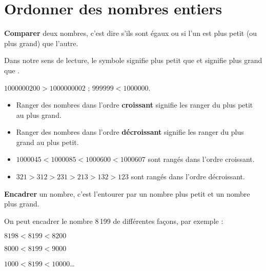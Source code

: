 \section{Ordonner des nombres entiers}

\begin{definition}
   {\bf Comparer} deux nombres, c'est dire s'ils sont égaux ou si l'un est plus petit (ou plus grand) que l'autre.
\end{definition}

\begin{notation}
   Dans notre sens de lecture, le symbole \fbox{<} signifie \og plus petit que \fg{} et \fbox{>} signifie \og plus grand que \fg.
\end{notation}

\begin{exemple*1}
   $\num{1000000200} > \num{1000000002}$ \qquad ; \qquad $\num{999999}<\num{1000000}$.
\end{exemple*1}

\bigskip

\begin{definition}
   \begin{itemize}
      \item Ranger des nombres dans l'ordre {\bf croissant} signifie les ranger du plus petit au plus grand.
       \item Ranger des nombres dans l'ordre {\bf décroissant} signifie les ranger du plus grand au plus petit.
   \end{itemize}
\end{definition}

\begin{exemple*1}
   \begin{itemize}
      \item $\num{1000045}<\num{1000085}<\num{1000600}<\num{1000607}$ sont rangés dans l'ordre croissant.
      \item $321>312>231>213>132>123$ sont rangés dans l'ordre décroissant.
   \end{itemize}  
\end{exemple*1}

\begin{definition}
 {\bf Encadrer} un nombre, c'est l'entourer par un nombre plus petit et un nombre plus grand.
\end{definition}

\begin{exemple*1}
   On peut encadrer le nombre 8\,199 de différentes façons, par exemple :   
   \begin{colitemize}{3}
     \item $\num{8198}<\num{8199}<\num{8200}$
     \item $\num{8000}<\num{8199}<\num{9000}$
     \item $\num{1000}<\num{8199}<\num{10000}$\dots
   \end{colitemize}
\end{exemple*1}